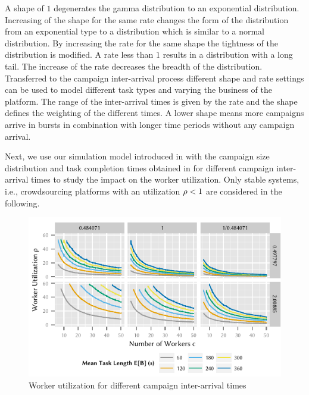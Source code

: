 A shape of \(1\) degenerates the gamma distribution to an exponential distribution.
Increasing of the shape for the same rate changes the form of the distribution from an exponential type to a distribution which is similar to a normal distribution.
By increasing the rate for the same shape the tightness of the distribution is modified.
A rate less than \(1\) results in a distribution with a long tail.
The increase of the rate decreases the breadth of the distribution.
Transferred to the campaign inter-arrival process different shape and rate settings can be used to model different task types and varying the business of the platform.
The range of the inter-arrival times is given by the rate and the shape defines the weighting of the different times.
A lower shape means more campaigns arrive in bursts in combination with longer time periods without any campaign arrival.

Next, we use our simulation model introduced in  with the campaign size distribution and task completion times obtained in  for different campaign inter-arrival times to study the impact on the worker utilization. 
Only stable systems, i.e., crowdsourcing platforms with an utilization \(\rho < 1\) are considered in the following.

\begin{figure}
	\centering
	\includegraphics{cloud/crowdsourcing/numerical_evaluation/figures/parameter_utilization}
	\caption{Worker utilization for different campaign inter-arrival times}
	\label{fig:cloud:crowdsourcing:performance_evaluation:distributions:parameter_utilization}
\end{figure}

